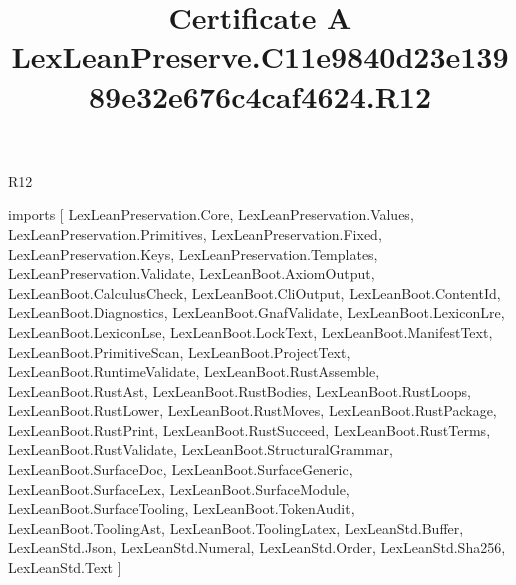 \begin{lexlean}{R12}
\title{Certificate A LexLeanPreserve.C11e9840d23e13989e32e676c4caf4624.R12}
\begin{coremodule}
imports [
  LexLeanPreservation.Core,
  LexLeanPreservation.Values,
  LexLeanPreservation.Primitives,
  LexLeanPreservation.Fixed,
  LexLeanPreservation.Keys,
  LexLeanPreservation.Templates,
  LexLeanPreservation.Validate,
  LexLeanBoot.AxiomOutput,
  LexLeanBoot.CalculusCheck,
  LexLeanBoot.CliOutput,
  LexLeanBoot.ContentId,
  LexLeanBoot.Diagnostics,
  LexLeanBoot.GnafValidate,
  LexLeanBoot.LexiconLre,
  LexLeanBoot.LexiconLse,
  LexLeanBoot.LockText,
  LexLeanBoot.ManifestText,
  LexLeanBoot.PrimitiveScan,
  LexLeanBoot.ProjectText,
  LexLeanBoot.RuntimeValidate,
  LexLeanBoot.RustAssemble,
  LexLeanBoot.RustAst,
  LexLeanBoot.RustBodies,
  LexLeanBoot.RustLoops,
  LexLeanBoot.RustLower,
  LexLeanBoot.RustMoves,
  LexLeanBoot.RustPackage,
  LexLeanBoot.RustPrint,
  LexLeanBoot.RustSucceed,
  LexLeanBoot.RustTerms,
  LexLeanBoot.RustValidate,
  LexLeanBoot.StructuralGrammar,
  LexLeanBoot.SurfaceDoc,
  LexLeanBoot.SurfaceGeneric,
  LexLeanBoot.SurfaceLex,
  LexLeanBoot.SurfaceModule,
  LexLeanBoot.SurfaceTooling,
  LexLeanBoot.TokenAudit,
  LexLeanBoot.ToolingAst,
  LexLeanBoot.ToolingLatex,
  LexLeanStd.Buffer,
  LexLeanStd.Json,
  LexLeanStd.Numeral,
  LexLeanStd.Order,
  LexLeanStd.Sha256,
  LexLeanStd.Text
]


\end{coremodule}
\end{lexlean}
